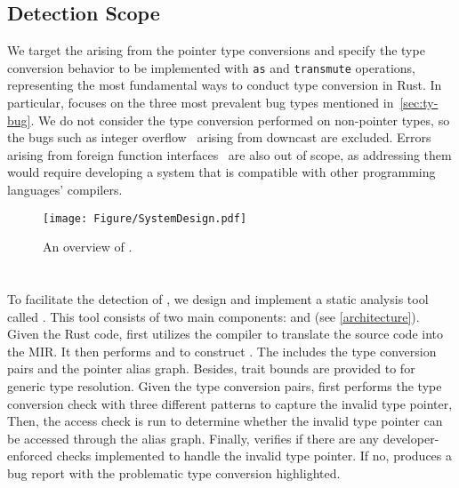 \subsection{Detection Scope}


We target the \bug arising from the pointer type conversions and specify the type conversion behavior to be implemented with \texttt{as} and \texttt{transmute} operations, representing the most fundamental ways to conduct type conversion in Rust. 
In particular,
\TN focuses on the three most prevalent bug types mentioned in~\autoref{sec:ty-bug}.
We do not consider the type conversion performed on non-pointer types, so the bugs such as integer overflow~\cite{rs-2024-0338, rs-2024-0016} arising from downcast are excluded.
Errors arising from foreign function interfaces~\cite{FFI} are also out of scope, as addressing them would require developing a system that is compatible with other programming languages' compilers.


\begin{figure}[t]
\centering
\texttt{[image: Figure/SystemDesign.pdf]}
\vspace{-10pt}
\caption{\label{fig:architecture} An overview of \TN.}
\label{architecture}
\end{figure}


\section{\TN}
\label{sec:design}




To facilitate the detection of \bugs, we design and implement a static analysis tool called \TN. 
This tool consists of two main components: \Tyanalyzer and \Bugdetector (see \autoref{architecture}). 
% 
{
Given the Rust code, \tyanalyzer first utilizes the compiler to translate the source code into the MIR. It then performs \analysisone and \analysistwo to construct \pcg. The \pcg includes  the type conversion pairs and  the pointer alias graph. Besides, trait bounds are provided to \bugdetector for generic type resolution.}
% 
Given the type conversion pairs, \bugdetector first performs the type conversion check with three different patterns to capture the invalid type pointer,
Then, the access check is run to determine whether the invalid type pointer can be accessed through the alias graph.
{
Finally, \bugdetector verifies if there are any developer-enforced checks implemented to handle the invalid type pointer.
%
If no, \TN produces a bug report with the problematic type conversion highlighted}. 

